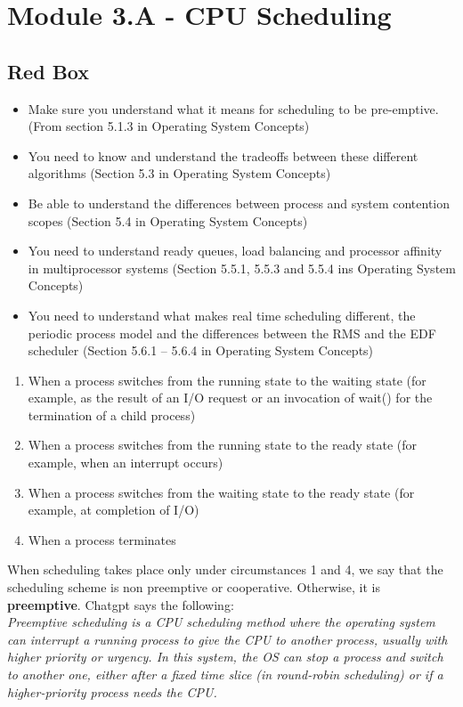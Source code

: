 \documentclass{article}
\begin{document}
\section{Module 3.A - CPU Scheduling}
\subsection{Red Box}
\begin{itemize}
    \item Make sure you understand what it means for scheduling to be pre-emptive.
    (From section 5.1.3 in Operating System Concepts)
    \item You need to know and understand the tradeoffs between these different algorithms
    (Section 5.3 in Operating System Concepts)
    \item Be able to understand the differences between process and system contention scopes
    (Section 5.4 in Operating System Concepts)
    \item You need to understand ready queues, load balancing and processor affinity in multiprocessor systems
    (Section 5.5.1, 5.5.3 and 5.5.4 ins Operating System Concepts)
    \item You need to understand what makes real time scheduling different, the periodic process model and the
    differences between the RMS and the EDF scheduler (Section 5.6.1 – 5.6.4 in Operating System Concepts)
\end{itemize}

\begin{enumerate}
    \item When a process switches from the running state to the waiting state (for
    example, as the result of an I/O request or an invocation of wait() for the
    termination of a child process)
    \item When a process switches from the running state to the ready state (for
    example, when an interrupt occurs)
    \item When a process switches from the waiting state to the ready state (for
    example, at completion of I/O)
    \item When a process terminates
\end{enumerate}

When scheduling takes place only under circumstances 1 and 4, we say that the scheduling scheme is non preemptive or cooperative.
Otherwise, it is {\bf preemptive}. 
Chatgpt says the following:
\\ {\it Preemptive scheduling is a CPU scheduling method where the operating system can interrupt a running process to give the CPU to another process, usually with higher priority or urgency.
In this system, the OS can stop a process and switch to another one, either after a fixed time slice (in round-robin scheduling) or if a higher-priority process needs the CPU.}
\end{document}
